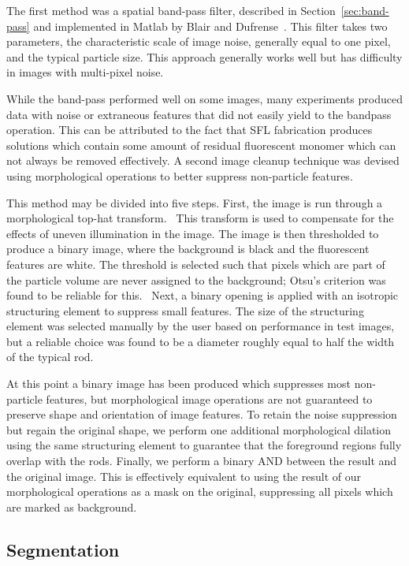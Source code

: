 The first method was a spatial band-pass filter, described in 
Section~\ref{sec:band-pass} and implemented in Matlab by Blair and
Dufrense~\cite{blair-dufrense-matlab}. This filter takes two parameters, the characteristic scale
of image noise, generally equal to one pixel, and the typical particle size.  This 
approach generally works well
but has difficulty in images with multi-pixel noise.

While the band-pass performed well on some images, many experiments produced data with noise or
extraneous features that did
not easily yield to the bandpass operation. This can be attributed to the fact that SFL fabrication produces
solutions which contain some amount of residual fluorescent monomer which
can not always be removed effectively.  A second image cleanup technique was devised using morphological
operations to better suppress non-particle features.

This method may be divided into five steps. First, the 
image is run through a morphological top-hat transform.~\cite{soille-book}
This transform is used to compensate for the effects of
uneven illumination in the image. The image is then thresholded to produce a binary image, where the 
background is black and the fluorescent features are white. The threshold is selected such that pixels which 
are part of the particle volume are never assigned to the background; Otsu's criterion was found to be reliable
for this.~\cite{otsu-threshold}  Next, a binary opening is applied with an isotropic structuring element to
suppress small features. The size of the structuring element was selected manually by the user
based on performance in test images, but a 
reliable choice was found to be a diameter roughly equal to half the width of the typical rod. 

At this point a binary image has been produced which suppresses most non-particle features, but morphological
image operations are not guaranteed to preserve shape and orientation of image features.  To retain the noise suppression
but regain the original shape, we perform one additional morphological dilation using the same structuring element to
guarantee that the foreground regions fully overlap with the rods. Finally, we perform a binary AND between the result and the
original image. This is effectively equivalent to using the result of our morphological operations as a mask on
the original, suppressing
all pixels which are marked as background.

\subsection{Segmentation}

